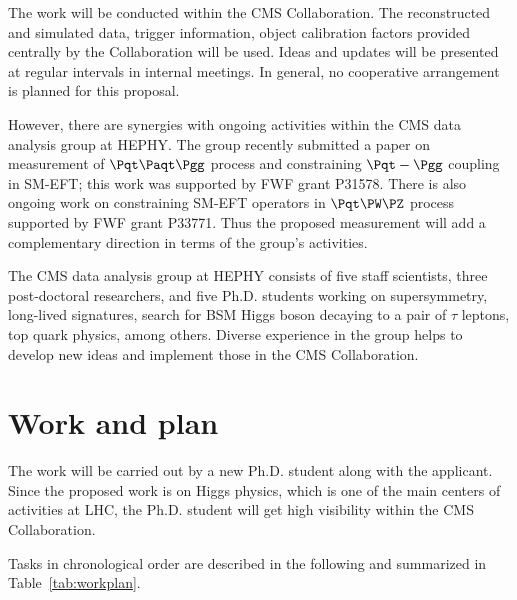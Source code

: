 \documentclass[a4paper,11pt]{article}
\newcommand{\Pt}{{{\Pqt}}\xspace}
\newcommand{\PAt}{{{{\Paqt}}}\xspace}
\begin{document}
The work will be conducted within the CMS Collaboration. The reconstructed and simulated data, trigger information, object calibration factors provided centrally by the Collaboration will be used. 
Ideas and updates will be presented at regular intervals in internal meetings. 
In general, no cooperative arrangement is planned for this proposal. 

However, there are synergies with ongoing activities within the CMS data analysis group at HEPHY. 
The group recently submitted a paper on measurement of $\Pt\PAt\Pgg$ process and constraining $\Pt-\Pgg$ coupling in SM-EFT; this work was supported by FWF grant P31578.
There is also ongoing work on constraining SM-EFT operators in $\Pt\PW\PZ$ process supported by FWF grant P33771. 
Thus the proposed measurement will add a complementary direction in terms of the group's activities.

The CMS data analysis group at HEPHY consists of five staff scientists, three post-doctoral researchers, and five Ph.D. students working on supersymmetry, long-lived signatures, search for BSM Higgs boson decaying to a pair of $\tau$ leptons, top quark physics, among others. 
Diverse experience in the group helps to develop new ideas and implement those in the CMS Collaboration.

\section{Work and plan}

The work will be carried out by a new Ph.D. student along with the applicant. 
Since the proposed work is on Higgs physics, which is one of the main centers of activities at LHC, the  
Ph.D. student will get high visibility within the CMS Collaboration.  

Tasks in chronological order are described in the following and summarized in Table~\ref{tab:workplan}.%
\end{document}
